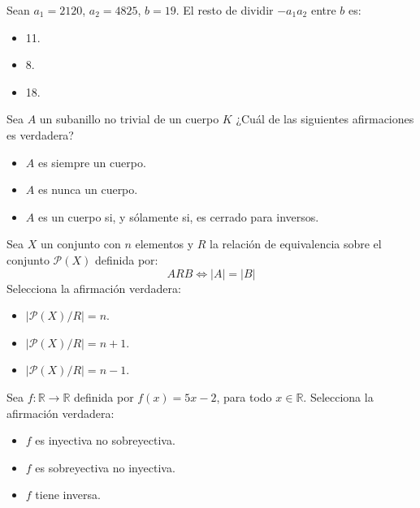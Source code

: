 \documentclass[12pt]{article}
\newcounter{ejercicio}[section] %
\newcounter{ejercicio}
\begin{document}
    \begin{ejercicio}
        Sean $a_1 = 2120$, $a_2 = 4825$, $b = 19$. El resto de dividir $-a_1a_2$ entre $b$ es:
        \begin{itemize}
            \item 11.
            \item 8.
            \item 18.
        \end{itemize}
    \end{ejercicio}

    \begin{ejercicio}
       Sea $A$ un subanillo no trivial de un cuerpo $K$ ¿Cuál de las siguientes afirmaciones es verdadera? 
        \begin{itemize}
            \item $A$ es siempre un cuerpo.
            \item $A$ es nunca un cuerpo.
            \item $A$ es un cuerpo si, y sólamente si, es cerrado para inversos.
        \end{itemize}
    \end{ejercicio}

    \begin{ejercicio}
        Sea $X$ un conjunto con $n$ elementos y $R$ la relación de equivalencia sobre el conjunto $\mathcal{P}(X)$ definida por:
        $$A R B \Leftrightarrow |A| = |B|$$
        Selecciona la afirmación verdadera:
        \begin{itemize}
            \item $|\mathcal{P}(X)/R| = n$.
            \item $|\mathcal{P}(X)/R| = n+1$.
            \item $|\mathcal{P}(X)/R| = n-1$.
        \end{itemize}
    \end{ejercicio}

    \begin{ejercicio}
        Sea $f:\mathbb{R} \rightarrow \mathbb{R}$ definida por $f(x) = 5x -2$, para todo $x \in \mathbb{R}$. Selecciona la afirmación verdadera:
        \begin{itemize}
            \item $f$ es inyectiva no sobreyectiva.
            \item $f$ es sobreyectiva no inyectiva.
            \item $f$ tiene inversa.
        \end{itemize}
    \end{ejercicio}
\end{document}
